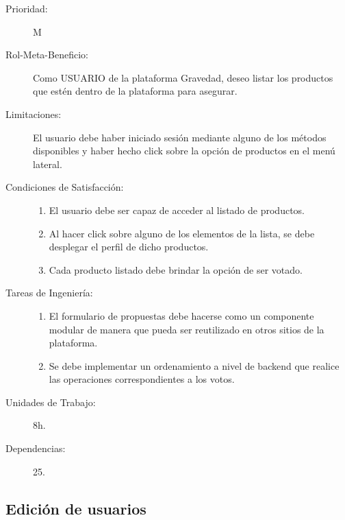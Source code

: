\begin{description}
    \item[Prioridad:] M
    \item[Rol-Meta-Beneficio:] Como USUARIO de la plataforma Gravedad, deseo listar los productos que estén dentro de la plataforma para asegurar.
    \item[Limitaciones:] El usuario debe haber iniciado sesión mediante alguno de los métodos disponibles y haber hecho click sobre la opción de productos en el menú lateral.
    \item[Condiciones de Satisfacción:]  \hfill
        \begin{enumerate}
            \item El usuario debe ser capaz de acceder al listado de productos.
        	\item Al hacer click sobre alguno de los elementos de la lista, se debe desplegar el perfil de dicho productos.
        	\item Cada producto listado debe brindar la opción de ser votado.
        \end{enumerate}
    \item[Tareas de Ingeniería:]  \hfill
        \begin{enumerate}
            \item El formulario de propuestas debe hacerse como un componente modular de manera que pueda ser reutilizado en otros sitios de la plataforma.
    		\item Se debe implementar un ordenamiento a nivel de backend que realice las operaciones correspondientes a los votos.
        \end{enumerate}
    \item[Unidades de Trabajo:] 8h.
    \item[Dependencias:] 25.
\end{description}

\newpage


\subsection{Edición de usuarios}

